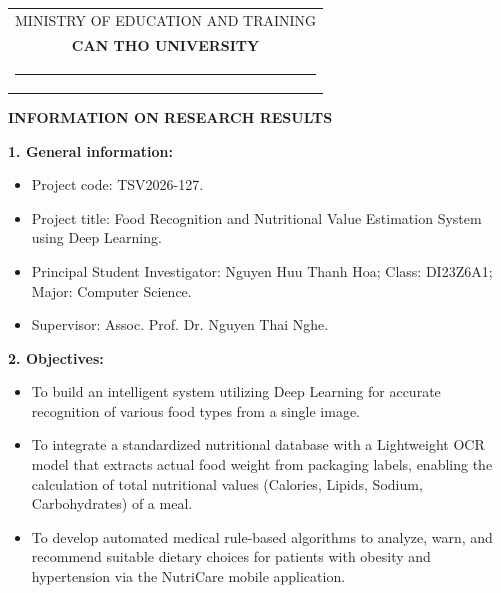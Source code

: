 \clearpage %
{}

\noindent
\begin{tabular}{@{}c@{}}
    \fontsize{12pt}{15pt}\selectfont MINISTRY OF EDUCATION AND TRAINING \\
    \fontsize{12pt}{15pt}\selectfont \textbf{CAN THO UNIVERSITY} \\[-20pt]
    \rule{3.2cm}{0.6pt}
\end{tabular}

\vspace{0.8cm}

\begin{center}
    {\fontsize{14pt}{18pt}\selectfont\bfseries INFORMATION ON RESEARCH RESULTS\par}
\end{center}

\vspace{0.5cm}

\noindent\textbf{1. General information:}
\begin{itemize}[leftmargin=0.8cm, label=\textbullet, itemsep=2pt, topsep=2pt]
    \item Project code: TSV2026-127.
    \item Project title: Food Recognition and Nutritional Value Estimation System using Deep Learning.
    \item Principal Student Investigator: Nguyen Huu Thanh Hoa; Class: DI23Z6A1; Major: Computer Science.
    \item Supervisor: Assoc. Prof. Dr. Nguyen Thai Nghe.
\end{itemize}

\vspace{0.3cm}
\noindent\textbf{2. Objectives:}
\begin{itemize}[leftmargin=0.8cm, label=\textbullet, itemsep=2pt, topsep=2pt]
    \item To build an intelligent system utilizing Deep Learning for accurate recognition of various food types from a single image.
    \item To integrate a standardized nutritional database with a Lightweight OCR model that extracts actual food weight from packaging labels, enabling the calculation of total nutritional values (Calories, Lipids, Sodium, Carbohydrates) of a meal.
    \item To develop automated medical rule-based algorithms to analyze, warn, and recommend suitable dietary choices for patients with obesity and hypertension via the NutriCare mobile application.
\end{itemize}

